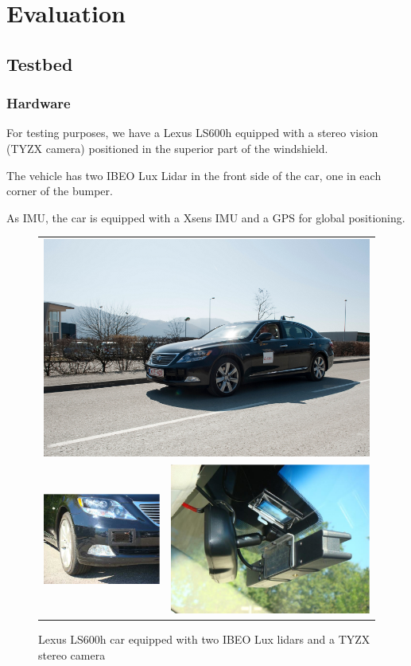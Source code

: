 \section{Evaluation}


\subsection{Testbed}
\label{sec:testbed}

\subsubsection*{Hardware}

For testing purposes, we have a Lexus LS600h equipped with a stereo vision (TYZX camera) positioned in the superior part of the windshield.

The vehicle has two IBEO Lux Lidar in the front side of the car, one in each corner of the bumper.

As IMU, the car is equipped with a Xsens IMU and a GPS for global positioning.

\begin{figure}[h]
   \centering
     \begin{tabular}{lr}
     \multicolumn{2}{c}{ \includegraphics[width=0.55\columnwidth]{img/testbed:car}}\\
       \includegraphics[width=0.40\columnwidth]{img/testbed:ibeo}
       &\includegraphics[width=0.40\columnwidth]{img/testbed:tyzx}
     \end{tabular}
   \caption{Lexus LS600h car equipped with two IBEO Lux lidars and a TYZX
     stereo camera}
   \label{fig:Lexus}
 \end{figure}

